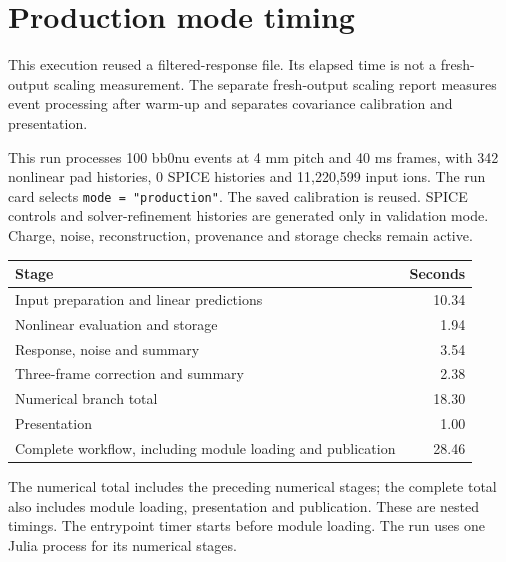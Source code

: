 \section{Production mode timing}
This execution reused a filtered-response file. Its elapsed time is not a fresh-output scaling measurement. The separate fresh-output scaling report measures event processing after warm-up and separates covariance calibration and presentation. 

This run processes 100 bb0nu events at 4 mm pitch and 40 ms frames, with 342 nonlinear pad histories, 0 SPICE histories and 11,220,599 input ions. The run card selects \texttt{mode = "production"}.
The saved calibration is reused. SPICE controls and solver-refinement histories are generated only in validation mode. Charge, noise, reconstruction, provenance and storage checks remain active.
\begin{center}\small\begin{tabular}{p{11cm}r}\toprule Stage & Seconds\\\midrule
Input preparation and linear predictions & 10.34 \\
Nonlinear evaluation and storage & 1.94 \\
Response, noise and summary & 3.54 \\
Three-frame correction and summary & 2.38 \\
Numerical branch total & 18.30 \\
Presentation & 1.00 \\
Complete workflow, including module loading and publication & 28.46 \\
\bottomrule\end{tabular}\end{center}
The numerical total includes the preceding numerical stages; the complete total also includes module loading, presentation and publication. These are nested timings. The entrypoint timer starts before module loading. The run uses one Julia process for its numerical stages.
